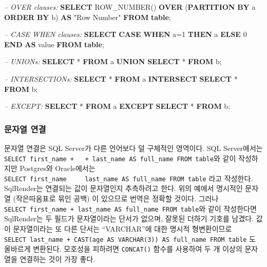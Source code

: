 \documentclass[11pt]{book}
\newenvironment{Shaded}{\begin{snugshade}}{\end{snugshade}}
\newcommand{\KeywordTok}[1]{\textcolor[rgb]{0.13,0.29,0.53}{\textbf{#1}}}
\newcommand{\DecValTok}[1]{\textcolor[rgb]{0.00,0.00,0.81}{#1}}
\newcommand{\CommentTok}[1]{\textcolor[rgb]{0.56,0.35,0.01}{\textit{#1}}}
\newcommand{\OtherTok}[1]{\textcolor[rgb]{0.56,0.35,0.01}{#1}}
\newcommand{\FunctionTok}[1]{\textcolor[rgb]{0.00,0.00,0.00}{#1}}
\newcommand{\NormalTok}[1]{#1}
\theoremstyle{definition}
\theoremstyle{definition}
\theoremstyle{definition}
\theoremstyle{remark}
\begin{document}
\begin{Shaded}
\begin{Highlighting}[]
\CommentTok{-- OVER clauses:}
\KeywordTok{SELECT} \FunctionTok{ROW_NUMBER}\NormalTok{() }\KeywordTok{OVER}\NormalTok{ (}\KeywordTok{PARTITION} \KeywordTok{BY}\NormalTok{ a }\KeywordTok{ORDER} \KeywordTok{BY}\NormalTok{ b)}
  \KeywordTok{AS} \OtherTok{"Row Number"} \KeywordTok{FROM} \KeywordTok{table}\NormalTok{;}
  
\CommentTok{-- CASE WHEN clauses:}
\KeywordTok{SELECT} \KeywordTok{CASE} \KeywordTok{WHEN}\NormalTok{ a=}\DecValTok{1} \KeywordTok{THEN}\NormalTok{ a }\KeywordTok{ELSE} \DecValTok{0} \KeywordTok{END} \KeywordTok{AS} \FunctionTok{value} \KeywordTok{FROM} \KeywordTok{table}\NormalTok{;}

\CommentTok{-- UNIONs:}
\KeywordTok{SELECT}\NormalTok{ * }\KeywordTok{FROM}\NormalTok{ a }\KeywordTok{UNION} \KeywordTok{SELECT}\NormalTok{ * }\KeywordTok{FROM}\NormalTok{ b;}

\CommentTok{-- INTERSECTIONs:}
\KeywordTok{SELECT}\NormalTok{ * }\KeywordTok{FROM}\NormalTok{ a }\KeywordTok{INTERSECT} \KeywordTok{SELECT}\NormalTok{ * }\KeywordTok{FROM}\NormalTok{ b;}

\CommentTok{-- EXCEPT:}
\KeywordTok{SELECT}\NormalTok{ * }\KeywordTok{FROM}\NormalTok{ a }\KeywordTok{EXCEPT} \KeywordTok{SELECT}\NormalTok{ * }\KeywordTok{FROM}\NormalTok{ b;}
\end{Highlighting}
\end{Shaded}

\subsubsection*{문자열 연결}\label{-}

문자열 연결은 SQL Server가 다른 언어보다 덜 구체적인 영역이다. SQL
Server에서는
\texttt{SELECT\ first\_name\ +\ \textquotesingle{}\ \textquotesingle{}\ +\ last\_name\ AS\ full\_name\ FROM\ table}와
같이 작성하지만 Postgres와 Oracle에서는
\texttt{SELECT\ first\_name\ \textbar{}\textbar{}\ \textquotesingle{}\ \textquotesingle{}\ \textbar{}\textbar{}\ last\_name\ AS\ full\_name\ FROM\ table}
라고 작성한다. SqlRender는 연결되는 값이 문자열인지 추측하려고 한다.
위의 예에서 명시적인 문자열 (작은따옴표로 묶인 공백) 이 있으므로 번역은
정확할 것이다. 그러나
\texttt{SELECT\ first\_name\ +\ last\_name\ AS\ full\_name\ FROM\ table}와
같이 작성한다면 SqlRender는 두 필드가 문자열이라는 단서가 없으며, 잘못된
더하기 기호를 남겼다. 값이 문자열이라는 또 다른 단서는 ``VARCHAR''에
대한 명시적 형변환이므로
\texttt{SELECT\ last\_name\ +\ CAST(age\ AS\ VARCHAR(3))\ AS\ full\_name\ FROM\ table}
도 올바르게 변환된다. 모호성을 피하려면 \texttt{CONCAT()} 함수를
사용하여 두 개 이상의 문자열을 연결하는 것이 가장 좋다.
\end{document}
